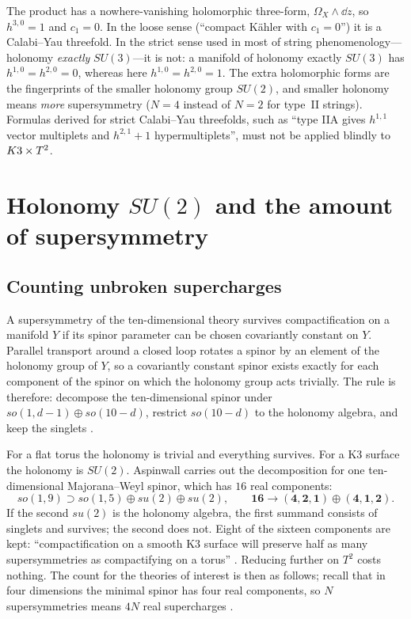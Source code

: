 \begin{pitfallbox}
The product has a nowhere-vanishing holomorphic three-form, $\Omega_X\wedge\dd z$, so
$h^{3,0}=1$ and $c_1=0$. In the loose sense (``compact K\"ahler with $c_1=0$'') it is a
Calabi--Yau threefold. In the strict sense used in most of string phenomenology---holonomy
\emph{exactly} $SU(3)$---it is not: a manifold of holonomy exactly $SU(3)$ has $h^{1,0}=
h^{2,0}=0$, whereas here $h^{1,0}=h^{2,0}=1$. The extra holomorphic forms are the fingerprints
of the smaller holonomy group $SU(2)$, and smaller holonomy means \emph{more} supersymmetry
($N=4$ instead of $N=2$ for type~II strings). Formulas derived for strict Calabi--Yau
threefolds, such as ``type IIA gives $h^{1,1}$ vector multiplets and $h^{2,1}+1$
hypermultiplets'', must not be applied blindly to $K3\times T^2$.
\end{pitfallbox}

\section{Holonomy \texorpdfstring{$SU(2)$}{SU(2)} and the amount of supersymmetry}
\label{sec:k3t2:susy}

\subsection{Counting unbroken supercharges}
A supersymmetry of the ten-dimensional theory survives compactification on a manifold $Y$ if
its spinor parameter can be chosen covariantly constant on $Y$. Parallel transport around a
closed loop rotates a spinor by an element of the holonomy group of $Y$, so a
covariantly constant spinor exists exactly for each component of the spinor on which the
holonomy group acts trivially. The rule is therefore: decompose the ten-dimensional spinor under
$so(1,d-1)\oplus so(10-d)$, restrict $so(10-d)$ to the holonomy algebra, and keep the
singlets .

For a flat torus the holonomy is trivial and everything survives. For a K3 surface the
holonomy is $SU(2)$. Aspinwall carries out the decomposition for one ten-dimensional
Majorana--Weyl spinor, which has $16$ real components:
\begin{equation}\label{eq:k3t2:spinor}
 so(1,9)\supset so(1,5)\oplus su(2)\oplus su(2),\qquad
 \mathbf{16}\to(\mathbf 4,\mathbf 2,\mathbf 1)\oplus(\mathbf 4,\mathbf 1,\mathbf 2).
\end{equation}
If the second $su(2)$ is the holonomy algebra, the first summand consists of singlets and
survives; the second does not. Eight of the sixteen components are kept: ``compactification on
a smooth K3 surface will preserve half as many supersymmetries as compactifying on a torus''
. Reducing further on $T^2$ costs nothing. The count for the
theories of interest is then as follows; recall that in four dimensions the minimal spinor has
four real components, so $N$ supersymmetries means $4N$ real supercharges
.

